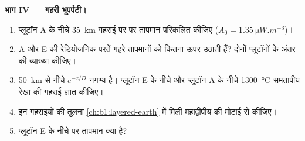 \begin{problem}
\noindent\textbf{भाग IV --- गहरी भूपर्पटी।}
\begin{enumerate}[resume]
  \item प्लूटॉन A के नीचे \qty{35}{km} गहराई पर  पर तापमान परिकलित कीजिए ($A_0 = \qty{1.35}{\micro W.m^{-3}}$)।
  \item A और E की रेडियोजनिक परतें गहरे तापमानों को कितना ऊपर उठाती हैं? दोनों प्लूटॉनों के अंतर की व्याख्या कीजिए।
  \item \qty{50}{km} से नीचे $e^{-z/D}$ नगण्य है। प्लूटॉन E के नीचे और प्लूटॉन A के नीचे \qty{1300}{\degreeCelsius} समतापीय रेखा की गहराई ज्ञात कीजिए।
  \item इन गहराइयों की तुलना \cref{ch:b1:layered-earth} में मिली महाद्वीपीय  की मोटाई से कीजिए।
  \item प्लूटॉन E के नीचे  पर तापमान क्या है?
\end{enumerate}
\end{problem}
